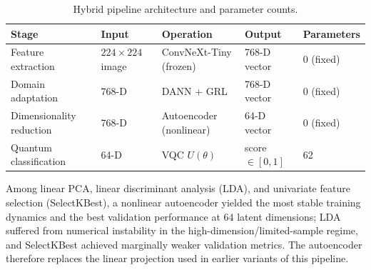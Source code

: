 \documentclass[11pt,a4paper]{article}
\begin{document}
\begin{table}[htbp]
\centering
\small
\caption{Hybrid pipeline architecture and parameter counts.}
\label{tab:pipeline}
\begin{tabular}{@{}p{2.9cm}p{2.2cm}p{3.5cm}p{2.2cm}p{2.1cm}@{}}
\toprule
Stage & Input & Operation & Output & Parameters \\
\midrule
Feature extraction & $224\times224$ image & ConvNeXt-Tiny (frozen) & 768-D vector & 0 (fixed) \\
Domain adaptation & 768-D & DANN + GRL & 768-D vector & 0 (fixed) \\
Dimensionality reduction & 768-D & Autoencoder (nonlinear) & 64-D vector & 0 (fixed) \\
Quantum classification & 64-D & VQC $U(\theta)$ & score $\in [0,1]$ & 62 \\
\bottomrule
\end{tabular}
\end{table}

Among linear PCA, linear discriminant analysis (LDA), and univariate feature
selection (SelectKBest), a nonlinear autoencoder yielded the most stable
training dynamics and the best validation performance at 64 latent
dimensions; LDA suffered from numerical instability in the
high-dimension/limited-sample regime, and SelectKBest achieved marginally
weaker validation metrics.  The autoencoder therefore replaces the linear
projection used in earlier variants of this pipeline.
\end{document}
